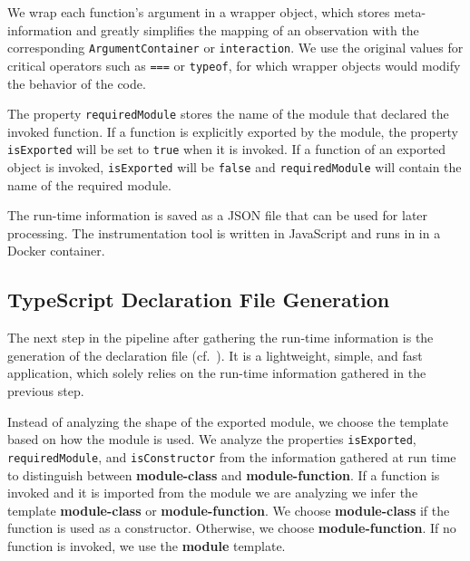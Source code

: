 \documentclass[sigconf]{acmart}
\begin{document}
We wrap each function's argument in a wrapper object, which  stores meta-information and greatly simplifies the mapping of an observation 
with the corresponding \texttt{ArgumentContainer} or \texttt{interaction}. We use the original values for critical operators such as 
\texttt{===} or \texttt{typeof}, for which wrapper objects would modify the behavior of the code.

The property \texttt{requiredModule} stores the name of the module that declared the invoked function. If a function is explicitly 
exported by the module, the property \texttt{isExported} will be set to \texttt{true} when it is invoked. If a function of an 
exported object is invoked, \texttt{isExported} will be \texttt{false} and \texttt{requiredModule} will contain the name of 
the required module.

The run-time information is saved as a JSON file that can be used for later
processing. The instrumentation tool is written in JavaScript and runs in \NodeJS{} in a
Docker container.   

\subsection{TypeScript Declaration File Generation}
\label{sec:typescr-decl-file}

The next step in the pipeline after gathering the run-time information is
the generation of the declaration file (cf.\
). It is a lightweight,
simple, and fast application, which solely relies on the run-time
information gathered in the previous step.

Instead of analyzing the shape of the exported module, we choose the
template based on how the module is used. We analyze the properties \texttt{isExported},
\texttt{requiredModule}, and \texttt{isConstructor} from the
information gathered at run time to distinguish
between \textbf{module-class} and \textbf{module-function}. If a function is invoked and
it is imported from the module we are analyzing we infer the template
\textbf{module-class} or \textbf{module-function}. We choose \textbf{module-class} if the
function is used as a constructor. Otherwise, we choose
\textbf{module-function}.
If no function is invoked, we use the \textbf{module}
template.
\end{document}
